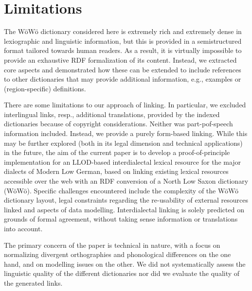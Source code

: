 \section*{Limitations}


The WöWö dictionary considered here is extremely rich and extremely dense in lexiographic and linguistic information, but this is provided in a semistructured format tailored towards human readers. As a result, it is virtually impossible to provide an exhaustive RDF formalization of its content. Instead, we extracted core aspects and demonstrated how these can be extended to include references to other dictionaries that may provide additional information, e.g., examples or (region-specific) definitions.

There are some limitations to our approach of linking. In particular, we excluded interlingual links, resp., additional translations, provided by the indexed dictionaries because of copyright considerations. Neither was part-pof-speech information included. Instead, we provide a purely form-based linking. While this may be further explored (both in its legal dimension and technical applications) in the future, the aim of the current paper is to develop a proof-of-principle implementation for an LLOD-based interdialectal lexical resource for the major dialects of Modern Low German, based on linking existing lexical resources accessible over the web with an RDF conversion of a North Low Saxon dictionary (WöWö). Specific challenges encountered include the complexity of the WöWö dictionary layout, legal constraints regarding the re-usability of external resources linked and aspects of data modelling. Interdialectal linking is solely predicted on grounds of formal agreement, without taking sense information or translations into account.

The primary concern of the paper is technical in nature, with a focus on normalizing divergent orthographies and phonological differences on the one hand, and on modelling issues on the other. We did not systematically assess the linguistic quality of the different dictionaries nor did we evaluate the quality of the generated links. 

